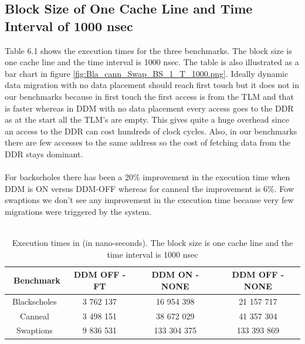 \documentclass{listhesis}
\begin{document}
\subsection{Block Size of One Cache Line and Time Interval of 1000 nsec}
Table 6.1 shows the execution times for the three benchmarks. The block size is one cache line and the time interval is 1000 nsec. The table is also illustrated as a bar chart in figure \ref{fig:Bla_cann_Swap_BS_1_T_1000.png}. Ideally dynamic data migration with no data placement should reach first touch but it does not in our benchmarks because in first touch the first access is from the TLM and that is faster whereas in DDM with no data placement every access goes to the DDR as at the start all the TLM's are empty. This gives quite a huge overhead since an access to the DDR can cost hundreds of clock cycles. Also, in our benchmarks there are few accesses to the same address so the cost of fetching data from the DDR stays dominant.\\
\\
For backscholes there has been a 20\% improvement in the execution time when DDM is ON versus DDM-OFF whereas for canneal the improvement is 6\%. Fow swaptions we don't see any improvement in the execution time because very few migrations were triggered by the system.\\
\\
\begin{table}[h!]
\begin{center}
 \begin{tabular}{|| c | c | c | c||} 
 \hline
 \ \textbf{Benchmark} & \textbf{DDM OFF - FT}  & \textbf{DDM ON - NONE}  & \textbf{DDM OFF - NONE}\\ [0.5 ex] 
 \hline\hline
  Blackscholes   &   3 762 137   &   16 954 398	    &  21 157 717 \\ 
 \hline
   Canneal  	&   3 498 151    &   38 672 029   	&   41 357 304   \\
 \hline
    Swaptions   &   9 836 531     &   133 304 375 	&   133 393 869   \\
 \hline
\end{tabular}
 \caption{Execution times in (in nano-seconds). The block size is one cache line and the time interval is 1000 nsec}
 \label{table:ExecTimes1}
\end{center}
\end{table}
\\
\end{document}
